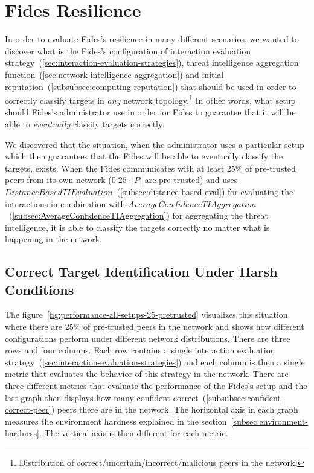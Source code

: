 \newpage
\section{Fides Resilience}
\label{sec:fides-resilience}

In order to evaluate Fides's resilience in many different scenarios, we wanted to discover what is the Fides's configuration of interaction evaluation strategy~(\ref{sec:interaction-evaluation-strategies}), threat intelligence aggregation function~(\ref{sec:network-intelligence-aggregation}) and initial reputation~(\ref{subsubsec:computing-reputation}) that should be used in order to correctly classify targets in \textit{any} network topology.\footnote{Distribution of correct/uncertain/incorrect/malicious peers in the network.}
In other words, what setup should Fides's administrator use in order for Fides to guarantee that it will be able to \textit{eventually} classify targets correctly.

We discovered that the situation, when the administrator uses a particular setup which then guarantees that the Fides will be able to eventually classify the targets, exists. When the Fides communicates with at least 25\% of pre-trusted peers from its own network ($0.25 \cdot |P|$ are pre-trusted) and uses $DistanceBasedTIEvaluation$~(\ref{subsec:distance-based-eval}) for evaluating the interactions in combination with $AverageConfidenceTIAggregation$~(\ref{subsec:AverageConfidenceTIAggregation}) for aggregating the threat intelligence, it is able to classify the targets correctly no matter what is happening in the network.

\subsection{Correct Target Identification Under Harsh Conditions}
\label{subsec:correct-target-identification-no-matter-what}

The figure~\ref{fig:performance-all-setups-25-pretrusted} visualizes this situation where there are 25\% of pre-trusted peers in the network and shows how different configurations perform under different network distributions.
There are three rows and four columns. Each row contains a single interaction evaluation strategy~(\ref{sec:interaction-evaluation-strategies}) and each column is then a single metric that evaluates the behavior of this strategy in the network.
There are three different metrics that evaluate the performance of the Fides's setup and the last graph then displays how many confident correct~(\ref{subsubsec:confident-correct-peer}) peers there are in the network.
The horizontal axis in each graph measures the environment hardness explained in the section~\ref{subsec:environment-hardness}.
The vertical axis is then different for each metric.

